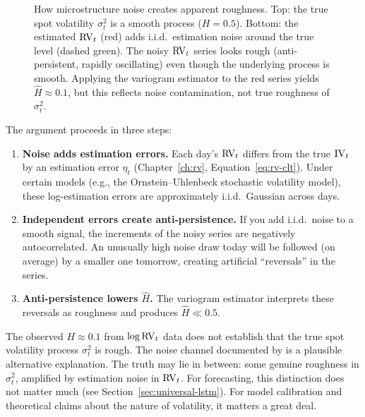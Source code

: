 \begin{figure}[htbp]
\caption{How microstructure noise creates apparent roughness.
Top: the true spot volatility $\sigma^2_t$ is a smooth process ($H = 0.5$).
Bottom: the estimated $\operatorname{RV}_t$ (red) adds i.i.d.\ estimation noise around the true level (dashed green).
The noisy $\operatorname{RV}_t$ series looks rough (anti-persistent, rapidly oscillating) even though the underlying process is smooth.
Applying the variogram estimator to the red series yields $\hat{H} \approx 0.1$, but this reflects noise contamination, not true roughness of $\sigma^2_t$.}
\label{fig:noise-roughness}
\end{figure}

The \citet{ContDas2024} argument proceeds in three steps:

\begin{enumerate}[nosep]
  \item \textbf{Noise adds estimation errors.} Each day's $\operatorname{RV}_t$ differs from the true $\operatorname{IV}_t$ by an estimation error $\eta_t$ (Chapter~\ref{ch:rv}, Equation~\ref{eq:rv-clt}). Under certain models (e.g., the Ornstein--Uhlenbeck stochastic volatility model), these log-estimation errors are approximately i.i.d.\ Gaussian across days.

  \item \textbf{Independent errors create anti-persistence.} If you add i.i.d.\ noise to a smooth signal, the increments of the noisy series are negatively autocorrelated. An unusually high noise draw today will be followed (on average) by a smaller one tomorrow, creating artificial ``reversals'' in the series.

  \item \textbf{Anti-persistence lowers $\hat{H}$.} The variogram estimator interprets these reversals as roughness and produces $\hat{H} \ll 0.5$.
\end{enumerate}

\begin{warning}[Do Not Equate $\hat{H} = 0.1$ with True Roughness]
The observed $H \approx 0.1$ from $\log \operatorname{RV}_t$ data does not establish that the true spot volatility process $\sigma^2_t$ is rough.
The noise channel documented by \citet{ContDas2024} is a plausible alternative explanation.
The truth may lie in between: some genuine roughness in $\sigma^2_t$, amplified by estimation noise in $\operatorname{RV}_t$.
For forecasting, this distinction does not matter much (see Section~\ref{sec:universal-lstm}).
For model calibration and theoretical claims about the nature of volatility, it matters a great deal.
\end{warning}

